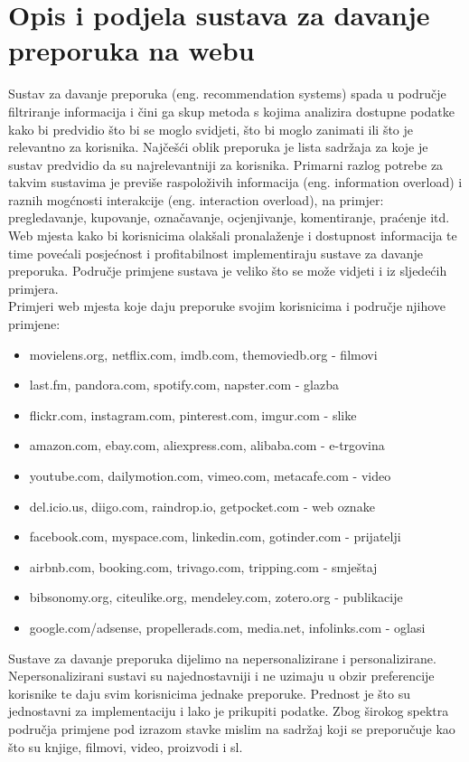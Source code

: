 \documentclass[a4paper,oneside,12pt]{memoir} %
\begin{document}
\chapter{Opis i podjela sustava za davanje preporuka na webu}	
Sustav za davanje preporuka (eng. recommendation systems) spada u područje filtriranje informacija i čini ga skup metoda s kojima analizira dostupne podatke kako bi predvidio što bi se moglo svidjeti, što bi moglo zanimati ili što je relevantno za korisnika. Najčešći oblik preporuka je lista sadržaja za koje je sustav predvidio da su najrelevantniji za korisnika. Primarni razlog potrebe za takvim sustavima je previše raspoloživih informacija (eng. information overload) i raznih mogćnosti interakcije (eng. interaction overload), na primjer: pregledavanje, kupovanje, označavanje, ocjenjivanje, komentiranje, praćenje itd. Web mjesta kako bi korisnicima olakšali pronalaženje i dostupnost informacija te time povećali posjećnost i profitabilnost implementiraju sustave za davanje preporuka. Područje primjene sustava je veliko što se može vidjeti i iz sljedećih primjera.
\bigskip
\\ Primjeri web mjesta koje daju preporuke svojim korisnicima i područje njihove primjene:
\begin{itemize}[topsep=2pt]
\setlength{\parskip}{0pt}
\item movielens.org, netflix.com, imdb.com, themoviedb.org - filmovi
\item last.fm, pandora.com, spotify.com, napster.com - glazba
\item flickr.com, instagram.com, pinterest.com, imgur.com - slike
\item amazon.com, ebay.com, aliexpress.com, alibaba.com - e-trgovina
\item youtube.com, dailymotion.com, vimeo.com, metacafe.com - video
\item del.icio.us, diigo.com, raindrop.io, getpocket.com - web oznake 
\item facebook.com, myspace.com, linkedin.com, gotinder.com - prijatelji
\item airbnb.com, booking.com, trivago.com, tripping.com - smještaj
\item bibsonomy.org, citeulike.org, mendeley.com, zotero.org - publikacije
\item google.com/adsense, propellerads.com, media.net, infolinks.com - oglasi
\end{itemize}
\bigskip
\par
Sustave za davanje preporuka dijelimo na nepersonalizirane i personalizirane. Nepersonalizirani sustavi su najednostavniji i ne uzimaju u obzir preferencije korisnike te daju svim korisnicima jednake preporuke. Prednost je što su jednostavni za implementaciju i lako je prikupiti podatke. Zbog širokog spektra područja primjene pod izrazom stavke mislim na sadržaj koji se preporučuje kao što su knjige, filmovi, video, proizvodi i sl.   
\end{document}
